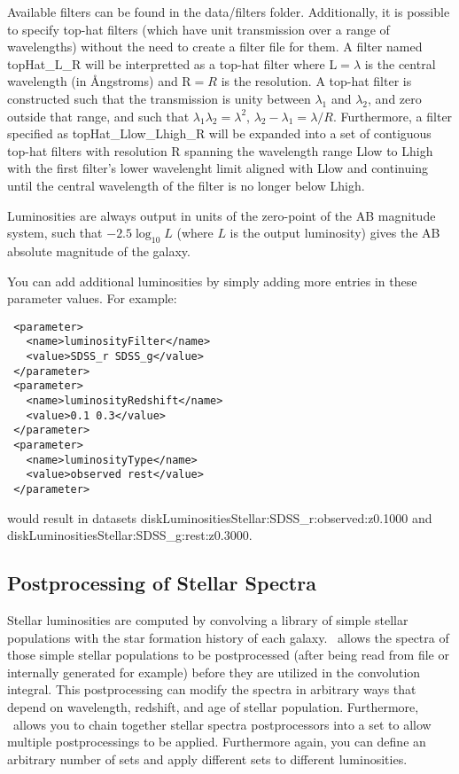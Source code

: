 Available filters can be found in the {\normalfont \ttfamily data/filters} folder. Additionally, it is possible to specify top-hat filters (which have unit transmission over a range of wavelengths) without the need to create a filter file for them. A filter named {\normalfont \ttfamily topHat\_L\_R} will be interpretted as a top-hat filter where {\normalfont \ttfamily L}$=\lambda$ is the central wavelength (in \AA ngstroms) and {\normalfont \ttfamily R}$=R$ is the resolution. A top-hat filter is constructed such that the transmission is unity between $\lambda_1$ and $\lambda_2$, and zero outside that range, and such that $\lambda_1\lambda_2=\lambda^2$, $\lambda_2-\lambda_1=\lambda/R$. Furthermore, a filter specified as {\normalfont \ttfamily topHat\_Llow\_Lhigh\_R} will be expanded into a set of contiguous top-hat filters with resolution {\normalfont \ttfamily R} spanning the wavelength range {\normalfont \ttfamily Llow} to {\normalfont \ttfamily Lhigh} with the first filter's lower wavelenght limit aligned with {\normalfont \ttfamily Llow} and continuing until the central wavelength of the filter is no longer below {\normalfont \ttfamily Lhigh}.

Luminosities are always output in units of the zero-point of the AB magnitude system, such that $-2.5\log_{10}L$ (where $L$ is the output luminosity) gives the AB absolute magnitude of the galaxy.

You can add additional luminosities by simply adding more entries in these parameter values. For example:
\begin{verbatim}
 <parameter>
   <name>luminosityFilter</name>
   <value>SDSS_r SDSS_g</value>
 </parameter>
 <parameter>
   <name>luminosityRedshift</name>
   <value>0.1 0.3</value>
 </parameter>
 <parameter>
   <name>luminosityType</name>
   <value>observed rest</value>
 </parameter>
\end{verbatim}
would result in datasets {\normalfont \ttfamily diskLuminositiesStellar:SDSS\_r:observed:z0.1000} and {\normalfont \ttfamily diskLuminositiesStellar:SDSS\_g:rest:z0.3000}. 

\subsection{Postprocessing of Stellar Spectra}

Stellar luminosities are computed by convolving a library of simple stellar populations with the star formation history of each galaxy. \glc\ allows the spectra of those simple stellar populations to be postprocessed (after being read from file or internally generated for example) before they are utilized in the convolution integral. This postprocessing can modify the spectra in arbitrary ways that depend on wavelength, redshift, and age of stellar population. Furthermore, \glc\ allows you to chain together stellar spectra postprocessors into a set to allow multiple postprocessings to be applied. Furthermore again, you can define an arbitrary number of sets and apply different sets to different luminosities.


